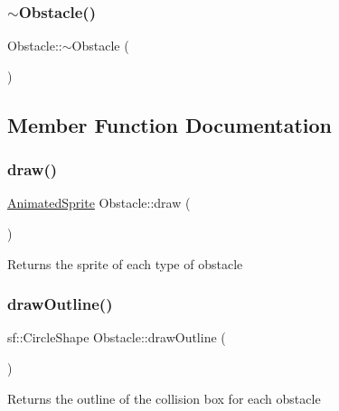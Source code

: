 \mbox{\label{class_obstacle_af2f9cc9c6cff75dca0974fd5ac4f71a9}} 
\subsubsection{\texorpdfstring{$\sim$\+Obstacle()}{~Obstacle()}}
{\footnotesize\ttfamily Obstacle\+::$\sim$\+Obstacle (\begin{DoxyParamCaption}{ }\end{DoxyParamCaption})}



\subsection{Member Function Documentation}
\mbox{\label{class_obstacle_add40c7f26670ee029480df409794269f}} 
\subsubsection{\texorpdfstring{draw()}{draw()}}
{\footnotesize\ttfamily \hyperlink{class_animated_sprite}{Animated\+Sprite} Obstacle\+::draw (\begin{DoxyParamCaption}{ }\end{DoxyParamCaption})}

Returns the sprite of each type of obstacle \mbox{\label{class_obstacle_aa353922843ff431a387e8988bc5f5364}} 
\subsubsection{\texorpdfstring{draw\+Outline()}{drawOutline()}}
{\footnotesize\ttfamily sf\+::\+Circle\+Shape Obstacle\+::draw\+Outline (\begin{DoxyParamCaption}{ }\end{DoxyParamCaption})}

Returns the outline of the collision box for each obstacle \mbox{\label{class_obstacle_a9717d2aec256d18e12d773e42e2c5034}} 
